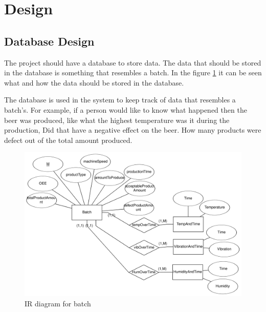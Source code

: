 \section{Design}

\subsection{Database Design}
The project should have a database to store data. 
The data that should be stored in the database is something that 
resembles a batch. In the figure \ref{figure:eer_diagram_batch} it can be seen
what and how the data should be stored in the database.


The database is used in the system to keep track of data that resembles a batch's.
For example, if a person would like to know what happened then the beer was produced,
like what the highest temperature was it during the production, Did that have a
negative effect on the beer.
How many products were defect out of the total amount produced. 

\begin{figure}[ht]
\centering 
\includegraphics[width=0.8\linewidth]{images/eer_diagrams/database_EER_batch.png}
\caption{IR diagram for batch} 
\label{figure:eer_diagram_batch}
\end{figure}
